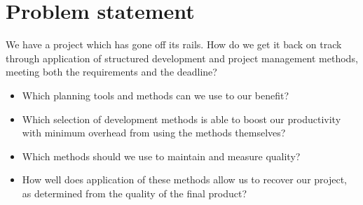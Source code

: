 \section{Problem statement}
We have a project which has gone off its rails. How do we get it back on track through application of structured development and project management methods, meeting both the requirements and the deadline?
\begin{itemize}
\item Which planning tools and methods can we use to our benefit?
\item Which selection of development methods is able to boost our productivity with minimum overhead from using the methods themselves?
\item Which methods should we use to maintain and measure quality?
\item How well does application of these methods allow us to recover our project, as determined from the quality of the final product?
\end{itemize}
\newpage